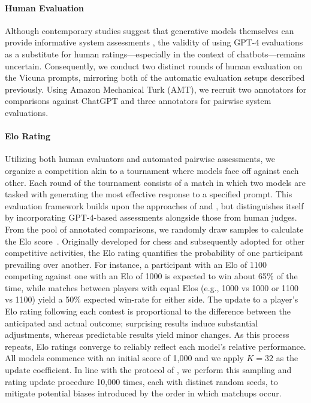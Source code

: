 \paragraph{Human Evaluation} Although contemporary studies suggest that generative models themselves can provide informative system assessments \citep{fu2023gptscore}, the validity of using GPT-4 evaluations as a substitute for human ratings—especially in the context of chatbots—remains uncertain. Consequently, we conduct two distinct rounds of human evaluation on the Vicuna prompts, mirroring both of the automatic evaluation setups described previously. Using Amazon Mechanical Turk (AMT), we recruit two annotators for comparisons against ChatGPT and three annotators for pairwise system evaluations.

\paragraph{Elo Rating} Utilizing both human evaluators and automated pairwise assessments, we organize a competition akin to a tournament where models face off against each other. Each round of the tournament consists of a match in which two models are tasked with generating the most effective response to a specified prompt. This evaluation framework builds upon the approaches of \citet{bai2022training} and \citet{vicuna2023}, but distinguishes itself by incorporating GPT-4-based assessments alongside those from human judges. From the pool of annotated comparisons, we randomly draw samples to calculate the Elo score~\citep{elo1967proposed,elo1978rating}. Originally developed for chess and subsequently adopted for other competitive activities, the Elo rating quantifies the probability of one participant prevailing over another. For instance, a participant with an Elo of 1100 competing against one with an Elo of 1000 is expected to win about 65\% of the time, while matches between players with equal Elos (e.g., 1000 vs 1000 or 1100 vs 1100) yield a 50\% expected win-rate for either side. The update to a player's Elo rating following each contest is proportional to the difference between the anticipated and actual outcome; surprising results induce substantial adjustments, whereas predictable results yield minor changes. As this process repeats, Elo ratings converge to reliably reflect each model’s relative performance. All models commence with an initial score of 1,000 and we apply $K=32$ as the update coefficient. In line with the protocol of \citet{vicuna2023}, we perform this sampling and rating update procedure 10,000 times, each with distinct random seeds, to mitigate potential biases introduced by the order in which matchups occur.

